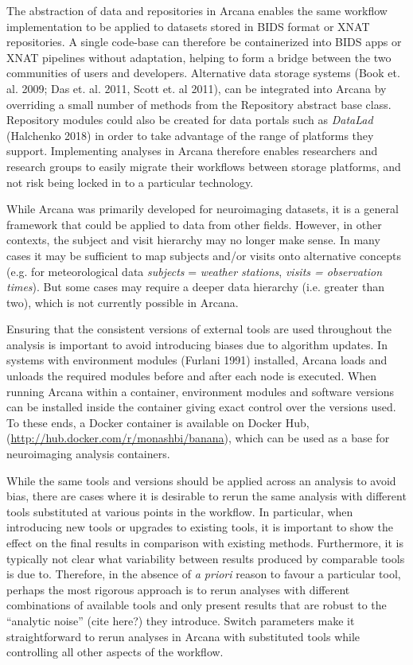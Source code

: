 The abstraction of data and repositories in Arcana enables the same
workflow implementation to be applied to datasets stored in BIDS format
or XNAT repositories. A single code-base can therefore be containerized
into BIDS apps or XNAT pipelines without adaptation, helping to form a
bridge between the two communities of users and developers. Alternative
data storage systems (Book et. al. 2009; Das et. al. 2011, Scott et. al
2011), can be integrated into Arcana by overriding a small number of
methods from the Repository abstract base class. Repository modules
could also be created for data portals such as \emph{DataLad} (Halchenko
2018) in order to take advantage of the range of platforms they support.
Implementing analyses in Arcana therefore enables researchers and
research groups to easily migrate their workflows between storage
platforms, and not risk being locked in to a particular technology.

While Arcana was primarily developed for neuroimaging datasets, it is a
general framework that could be applied to data from other fields.
However, in other contexts, the subject and visit hierarchy may no
longer make sense. In many cases it may be sufficient to map subjects
and/or visits onto alternative concepts (e.g. for meteorological data
\emph{subjects} = \emph{weather stations}, \emph{visits = observation
times}). But some cases may require a deeper data hierarchy (i.e.
greater than two), which is not currently possible in Arcana.

Ensuring that the consistent versions of external tools are used
throughout the analysis is important to avoid introducing biases due to
algorithm updates. In systems with environment modules (Furlani 1991)
installed, Arcana loads and unloads the required modules before and
after each node is executed. When running Arcana within a container,
environment modules and software versions can be installed inside the
container giving exact control over the versions used. To these ends, a
Docker container is available on Docker Hub,
(\href{http://hub.docker.com/r/monashbi/banana}{{http://hub.docker.com/r/monashbi/banana}}),
which can be used as a base for neuroimaging analysis containers.

While the same tools and versions should be applied across an analysis
to avoid bias, there are cases where it is desirable to rerun the same
analysis with different tools substituted at various points in the
workflow. In particular, when introducing new tools or upgrades to
existing tools, it is important to show the effect on the final results
in comparison with existing methods. Furthermore, it is typically not
clear what variability between results produced by comparable tools is
due to. Therefore, in the absence of \emph{a priori} reason to favour a
particular tool, perhaps the most rigorous approach is to rerun analyses
with different combinations of available tools and only present results
that are robust to the ``analytic noise'' (cite here?) they introduce.
Switch parameters make it straightforward to rerun analyses in Arcana
with substituted tools while controlling all other aspects of the
workflow.

